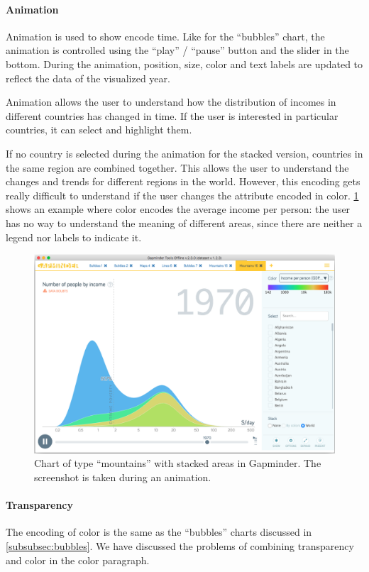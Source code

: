 \paragraph{Animation}
Animation is used to show encode time.
Like for the ``bubbles'' chart, the animation is controlled using the ``play'' / ``pause'' button and the slider in the bottom.
During the animation, position, size, color and text labels are updated to reflect the data of the visualized year.

Animation allows the user to understand how the distribution of incomes in different countries has changed in time.
If the user is interested in particular countries, it can select and highlight them.

If no country is selected during the animation for the stacked version, countries in the same region are combined together.
This allows the user to understand the changes and trends for different regions in the world.
However, this encoding gets really difficult to understand if the user changes the attribute encoded in color.
\cref{fig:mountains-animation} shows an example where color encodes the average income per person:
the user has no way to understand the meaning of different areas, since there are neither a legend nor labels to indicate it.

\begin{figure}[h]
	\centering
	\includegraphics[width=0.95\columnwidth]{figures/mountains-animation}
	\caption{Chart of type ``mountains'' with stacked areas in Gapminder. The screenshot is taken during an animation.}
	\label{fig:mountains-animation}
\end{figure}

\paragraph{Transparency}
The encoding of color is the same as the ``bubbles'' charts discussed in \cref{subsubsec:bubbles}.
We have discussed the problems of combining transparency and color in the color paragraph.


